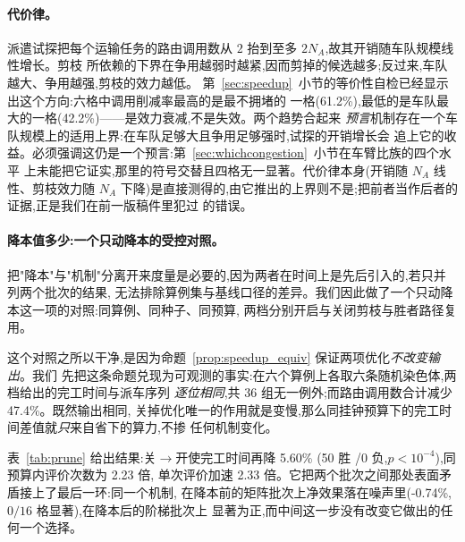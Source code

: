 \documentclass[manuscript,screen,review]{acmart}
\newcommand{\RouteCallCutLo}{42.2\%}     %
\newcommand{\RouteCallCutHi}{61.2\%}     %
\newcommand{\SpeedupProbe}{2.33}
\newcommand{\RouteCallCut}{47.4\%}
\newcommand{\GainPrune}{5.60\%}
\newcommand{\PPrune}{<10^{-4}}
\newcommand{\WinPrune}{50}
\newcommand{\LosePrune}{0}
\newcommand{\EvalRatioPrune}{2.23}
\newcommand{\GainProbePre}{-0.74\%}      %
\begin{document}
\paragraph{代价律。}
派遣试探把每个运输任务的路由调用数从 $2$ 抬到至多 $2N_A$,故其开销随车队规模线性增长。剪枝
所依赖的下界在争用越弱时越紧,因而剪掉的候选越多;反过来,车队越大、争用越强,剪枝的效力越低。
第~\ref{sec:speedup}~小节的等价性自检已经显示出这个方向:六格中调用削减率最高的是最不拥堵的
一格(\RouteCallCutHi{}),最低的是车队最大的一格(\RouteCallCutLo{})——是效力衰减,不是失效。两个趋势合起来
\emph{预言}机制存在一个车队规模上的适用上界:在车队足够大且争用足够强时,试探的开销增长会
追上它的收益。必须强调这仍是一个预言:第~\ref{sec:whichcongestion}~小节在车臂比族的四个水平
上未能把它证实,那里的符号交替且四格无一显著。代价律本身(开销随 $N_A$ 线性、剪枝效力随 $N_A$
下降)是直接测得的,由它推出的上界则不是;把前者当作后者的证据,正是我们在前一版稿件里犯过
的错误。

\paragraph{降本值多少:一个只动降本的受控对照。}
把"降本"与"机制"分离开来度量是必要的,因为两者在时间上是先后引入的,若只并列两个批次的结果,
无法排除算例集与基线口径的差异。我们因此做了一个只动降本这一项的对照:同算例、同种子、同预算,
两档分别开启与关闭剪枝与胜者路径复用。

这个对照之所以干净,是因为命题~\ref{prop:speedup_equiv} 保证两项优化\emph{不改变输出}。我们
先把这条命题兑现为可观测的事实:在六个算例上各取六条随机染色体,两档给出的完工时间与派车序列
\emph{逐位相同},共 $36$ 组无一例外;而路由调用数合计减少 \RouteCallCut{}。既然输出相同,
关掉优化唯一的作用就是变慢,那么同挂钟预算下的完工时间差值就\emph{只}来自省下的算力,不掺
任何机制变化。

表~\ref{tab:prune} 给出结果:关$\to$开使完工时间再降 \GainPrune{}
(\WinPrune{} 胜 /\LosePrune{} 负,$p\PPrune$),同预算内评价次数为 \EvalRatioPrune{} 倍,
单次评价加速 \SpeedupProbe{} 倍。它把两个批次之间那处表面矛盾接上了最后一环:同一个机制,
在降本前的矩阵批次上净效果落在噪声里(\GainProbePre{},$0/16$ 格显著),在降本后的阶梯批次上
显著为正,而中间这一步没有改变它做出的任何一个选择。

\begin{table}[t]
\caption{只改变剪枝与胜者路径复用的受控对照。两档输出逐位相同(已过等价性自检),故差值只来自
省下的算力。同算例、同种子、同挂钟预算;$n=60$ 配对。}
\label{tab:prune}
\small

\end{table}
\end{document}
